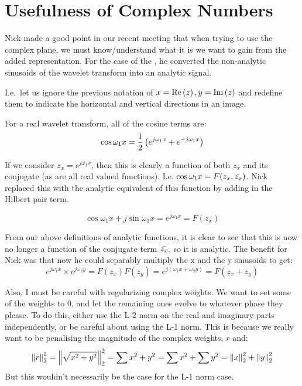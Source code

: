 \section{Usefulness of Complex Numbers}
Nick made a good point in our recent meeting that when trying to use the
complex plane, we must know/understand what it is we want to gain from the
added representation. For the case of the \DTCWT, he converted the non-analytic
sinusoids of the wavelet transform into an analytic signal.

I.e.\ let us ignore the previous notation of $x=\mathrm{Re}\left(z\right), y=\mathrm{Im}\left(z\right)$ and redefine
them to indicate the horizontal and vertical directions in an image.

For a real wavelet transform, all of the cosine terms are:
\begin{equation}
  \cos \omega_1 x = \frac{1}{2}\left(e^{j\omega_1 x} + e^{-j\omega_1 x} \right)
\end{equation}

If we consider $z_x = e^{j\omega_1 x}$, then this is clearly a function of both
$z_x$ and its conjugate (as are all real valued functions). I.e. $\cos \omega_1
x = F(z_x,\bar{z_x})$. Nick replaced this with the analytic equivalent of this
function by adding in the Hilbert pair term.

\begin{equation}
  \cos \omega_1 x +j \sin \omega_1 x = e^{j\omega_1 x} = F(z_x)
\end{equation}

From our above definitions of analytic functions, it is clear to see that this
is now no longer a function of the conjugate term $\bar{z_x}$, so it is analytic. The
benefit for Nick was that now he could separably multiply the x and the
y sinusoids to get:
\begin{equation}
  e^{j\omega_1 x} \times e^{j\omega_2 y} =F(z_x)F(z_y)= e^{j(\omega_1 x + \omega_2 y)} = F(z_x+z_y)
\end{equation}

Also, I must be careful with regularizing complex weights. We want to set some
of the weights to 0, and let the remaining ones evolve to whatever phase they
please. To do this, either use the L-2 norm on the real and imaginary parts
independently, or be careful about using the L-1 norm. This is because we
really want to be penalising the magnitude of the complex weights, $r$ and: 
\begin{equation}
  {\left\lVert r \right\rVert}_{2}^2 = {\left\lVert \sqrt{x^2+y^2} \right\rVert}_{2}^2 = \sum x^2 + y^2 = \sum x^2 + \sum y^2 = {\left\lVert x \right\rVert}_{2}^2 + {\left\lVert y \right\rVert}_{2}^2
\end{equation}
But this wouldn't necessarily be the case for the L-1 norm case.

